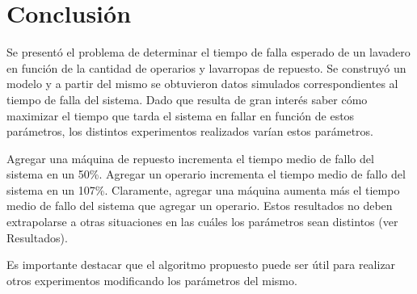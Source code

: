\section{Conclusión}

    \par Se presentó el problema de determinar el tiempo de falla esperado de un lavadero
    en función de la cantidad de operarios y lavarropas de repuesto. Se construyó un
    modelo y a partir del mismo se obtuvieron datos simulados correspondientes al
    tiempo de falla del sistema. Dado que resulta de gran interés saber cómo
    maximizar el tiempo que tarda el sistema en fallar en función de estos
    parámetros, los distintos experimentos realizados varían estos parámetros.


    \par Agregar una máquina de repuesto incrementa el tiempo medio de fallo del sistema
    en un 50\%. Agregar un operario incrementa el tiempo medio de fallo del sistema
    en un 107\%. Claramente, agregar una máquina aumenta más el tiempo medio de fallo
    del sistema que agregar un operario. Estos resultados no deben extrapolarse a
    otras situaciones en las cuáles los parámetros sean distintos (ver Resultados).

    \par Es importante destacar que el algoritmo propuesto puede ser útil para realizar
    otros experimentos modificando los parámetros del mismo.
